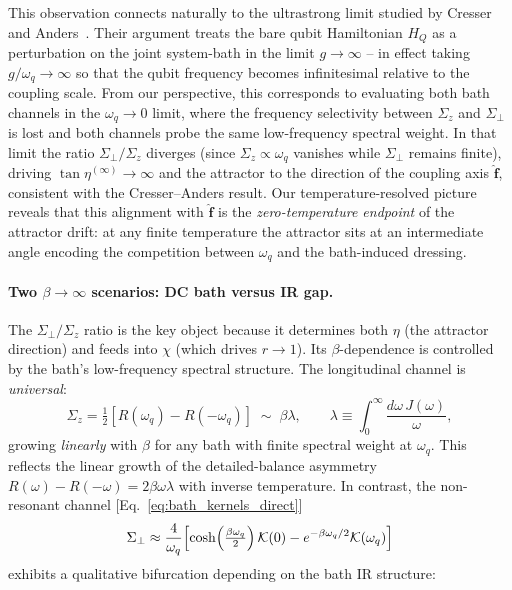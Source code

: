 This observation connects naturally to the ultrastrong limit studied by Cresser and
Anders~\cite{cresserWeakUltrastrongCoupling2021a}.  Their argument treats the bare
qubit Hamiltonian $H_Q$ as a perturbation on the joint system-bath in the limit
$g\to\infty$ -- in effect taking $g/\omega_q\to\infty$ so that the qubit frequency
becomes infinitesimal relative to the coupling scale.  From our perspective, this
corresponds to evaluating both bath channels in the $\omega_q\to 0$ limit, where
the frequency selectivity between $\Sigma_z$ and $\Sigma_\perp$ is lost and both
channels probe the same low-frequency spectral weight.  In that limit the ratio
$\Sigma_\perp/\Sigma_z$ diverges (since $\Sigma_z\propto\omega_q$ vanishes while
$\Sigma_\perp$ remains finite), driving $\tan\eta^{(\infty)}\to\infty$ and the
attractor to the direction of the coupling axis $\hat{\mathbf f}$, consistent with
the Cresser--Anders result.  Our temperature-resolved picture reveals that this
alignment with $\hat{\mathbf f}$ is the \emph{zero-temperature endpoint} of the
attractor drift: at any finite temperature the attractor sits at an intermediate
angle encoding the competition between $\omega_q$ and the bath-induced dressing.

\paragraph{Two $\beta\to\infty$ scenarios: DC bath versus IR gap.}
The $\Sigma_\perp/\Sigma_z$ ratio is the key object because it determines both $\eta$
(the attractor direction) and feeds into $\chi$ (which drives $r\to 1$).  Its
$\beta$-dependence is controlled by the bath's low-frequency spectral structure.
The longitudinal channel is \emph{universal}:
\begin{equation}
  \Sigma_z = \tfrac12[R(\omega_q)-R(-\omega_q)] \;\sim\; \beta\lambda, \qquad
  \lambda \equiv \int_0^\infty\frac{d\omega\,J(\omega)}{\omega},
  \label{eq:Sigma_z_linear}
\end{equation}
growing \emph{linearly} with $\beta$ for any bath with finite spectral weight at
$\omega_q$.  This reflects the linear growth of the detailed-balance asymmetry
$R(\omega) - R(-\omega) = 2\beta\omega\lambda$ with inverse temperature.  In contrast,
the non-resonant channel [Eq.~\eqref{eq:bath_kernels_direct}]
\begin{equation}
  \Sigma_\perp \approx \frac{4}{\omega_q}\Bigl[
    \cosh\!\left(\tfrac{\beta\omega_q}{2}\right)\mathcal{K}(0)
    - e^{-\beta\omega_q/2}\mathcal{K}(\omega_q)\Bigr]
  \label{eq:Sigma_perp_expanded}
\end{equation}
exhibits a qualitative bifurcation depending on the bath IR structure:

